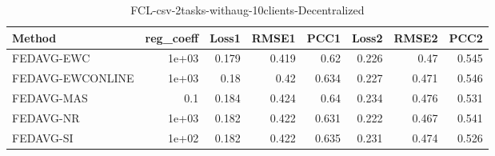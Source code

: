 \begin{table}
\caption{FCL-csv-2tasks-withaug-10clients-Decentralized}
\begin{tabular}{lrrrrrrr}
\toprule
Method & reg_coeff & Loss1 & RMSE1 & PCC1 & Loss2 & RMSE2 & PCC2 \\
\midrule
FEDAVG-EWC & 1e+03 & 0.179 & 0.419 & 0.62 & 0.226 & 0.47 & 0.545 \\
FEDAVG-EWCONLINE & 1e+03 & 0.18 & 0.42 & 0.634 & 0.227 & 0.471 & 0.546 \\
FEDAVG-MAS & 0.1 & 0.184 & 0.424 & 0.64 & 0.234 & 0.476 & 0.531 \\
FEDAVG-NR & 1e+03 & 0.182 & 0.422 & 0.631 & 0.222 & 0.467 & 0.541 \\
FEDAVG-SI & 1e+02 & 0.182 & 0.422 & 0.635 & 0.231 & 0.474 & 0.526 \\
\bottomrule
\end{tabular}
\end{table}
